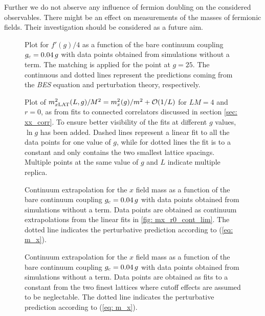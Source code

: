 Further we do not abserve any influence of fermion doubling on the considered observables. There might be an effect on measurements of the masses of fermionic fields. Their investigation should be considered as a future aim.
%
%
%
\begin{figure}
\centering

\caption{Plot for $f'(g)/4$ as a function of the bare continuum coupling $g_{\rm c}=0.04\,g$ with data points obtained from simulations without a  term. The matching is applied for the point at $g=25$. The continuous and dotted lines represent the predictions coming from the \textit{BES} equation and perturbation theory, respectively.
\label{fig: f_prime_r0}}
\end{figure}
%
%
%
\begin{figure}
\centering

\caption{Plot of $m_{x\rm LAT}^{2}(L,g)/M^{2}= m_{x}^{2}(g)/m^{2}+\mathcal{O}(1/L)$ for $LM=4$ and $r=0$, as from fits to connected correlators discussed in section \ref{sec: xx_corr}. To ensure better visibility of the fits at different $g$ values, $\ln g$ has been added. Dashed lines represent a linear fit to all the data points for one value of $g$, while for dotted lines the fit is to a constant and only contains the two smallest lattice spacings. Multiple points at the same value of $g$ and $L$ indicate multiple replica.
\label{fig: mx_r0_cont_lim}}
\end{figure}
%
%
%
\begin{figure}
\centering

\caption{Continuum extrapolation for the $x$ field mass as a function of the bare continuum coupling $g_{\rm c}=0.04\,g$ with data points obtained from simulations without a  term. Data points are obtained as continuum extrapolations from the linear fits in \autoref{fig: mx_r0_cont_lim}. The dotted line indicates the perturbative prediction according to (\ref{eq: m_x}).
\label{fig: mx_vs_g_r0}}
\end{figure}
%
%
%
\begin{figure}
\centering

\caption{Continuum extrapolation for the $x$ field mass as a function of the bare continuum coupling $g_{\rm c}=0.04\,g$ with data points obtained from simulations without a  term. Data points are obtained as fits to a constant from the two finest lattices where cutoff effects are assumed to be neglectable. The dotted line indicates the perturbative prediction according to (\ref{eq: m_x}).
\label{fig: mx_vs_g_r0_plateau}}
\end{figure}
%
%
%
